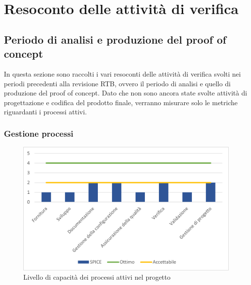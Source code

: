 \appendix
\section{Resoconto delle attività di verifica}
\subsection{Periodo di analisi e produzione del proof of concept}
In questa sezione sono raccolti i vari resoconti delle attività di verifica svolti nei periodi precedenti alla revisione RTB, ovvero il periodo di analisi e quello di produzione del proof of concept.
Dato che non sono ancora state svolte attività di progettazione e codifica del prodotto finale, verranno misurare solo le metriche riguardanti i processi attivi.
\subsubsection{Gestione processi}
\begin{figure}[H]
	\centering
	\includegraphics[scale=1.1]{img/SPICE.png}
	\caption{Livello di capacità dei processi attivi nel progetto}
\end{figure}
